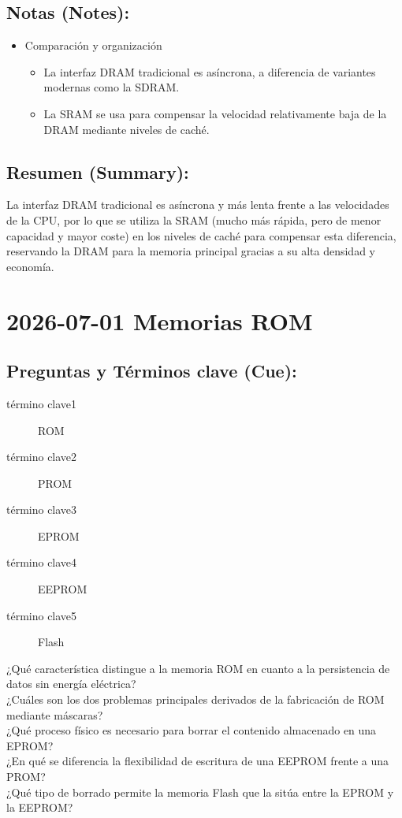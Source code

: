 \documentclass{article}
\begin{document}
\subsection{Notas (Notes):}
\label{sec:org8a58ce3}
\begin{itemize}
\item Comparación y organización
\begin{itemize}
\item La interfaz DRAM tradicional es asíncrona, a diferencia de
variantes modernas como la SDRAM.
\item La SRAM se usa para compensar la velocidad relativamente baja de
la DRAM mediante niveles de caché.
\end{itemize}
\end{itemize}

\subsection{Resumen (Summary):}
\label{sec:org1edef42}
La interfaz DRAM tradicional es asíncrona y más lenta frente a las
velocidades de la CPU, por lo que se utiliza la SRAM (mucho más rápida,
pero de menor capacidad y mayor coste) en los niveles de caché para
compensar esta diferencia, reservando la DRAM para la memoria principal
gracias a su alta densidad y economía.

\section{2026-07-01 Memorias ROM}
\label{sec:org08cd705}

\subsection{Preguntas y Términos clave (Cue):}
\label{sec:org91eadfe}
\begin{description}
\item[{término clave1}] ROM
\item[{término clave2}] PROM
\item[{término clave3}] EPROM
\item[{término clave4}] EEPROM
\item[{término clave5}] Flash
\item[{¿Qué característica distingue a la memoria ROM en cuanto a la persistencia de datos sin energía eléctrica?}] 

\item[{¿Cuáles son los dos problemas principales derivados de la fabricación de ROM mediante máscaras?}] 

\item[{¿Qué proceso físico es necesario para borrar el contenido almacenado en una EPROM?}] 

\item[{¿En qué se diferencia la flexibilidad de escritura de una EEPROM frente a una PROM?}] 

\item[{¿Qué tipo de borrado permite la memoria Flash que la sitúa entre la EPROM y la EEPROM?}] 
\end{description}
\end{document}
